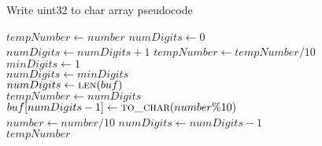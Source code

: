 \documentclass[12pt]{report}
\begin{document}
\begin{algorithm}
    \caption{Write uint32 to char array pseudocode}
    \label{code:write_uint32}
    \begin{algorithmic}[1]

            \State $tempNumber \gets number$
            \State $numDigits \gets 0$
            \\

                \State $numDigits \gets numDigits + 1$
                \State $tempNumber \gets tempNumber / 10$
            \EndWhile\\

                \State $minDigits \gets 1$
            \EndIf\\

                \State $numDigits \gets minDigits$
            \EndIf\\

                \State $numDigits \gets \Call {len}{buf}$
            \EndIf\\

            \State $tempNumber \gets numDigits$\\

                    \State $buf \lbrack numDigits - 1 \rbrack \gets \Call
                        {to\_char}{number \% 10}$
                \EndIf\\

                \State $number \gets number / 10$
                \State $numDigits \gets numDigits - 1$
            \EndWhile\\

            \State \Return $tempNumber$
        \EndFunction
    \end{algorithmic}
\end{algorithm}
\end{document}
